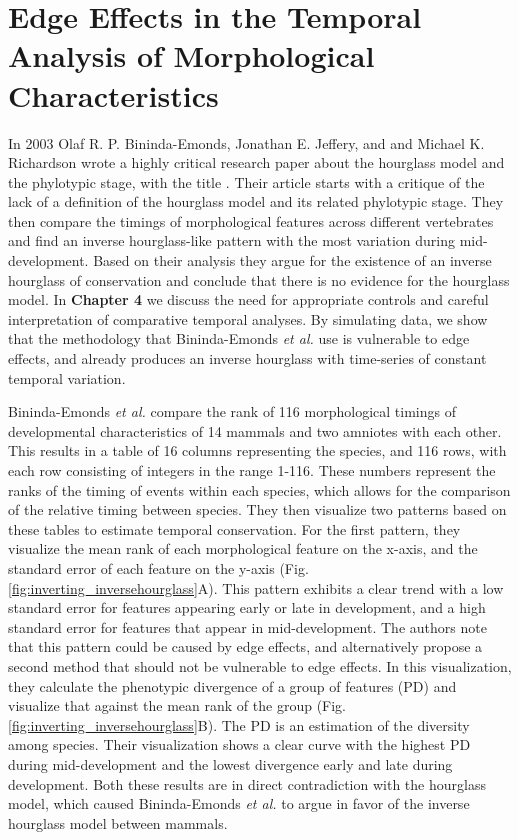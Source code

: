 \chapter{Edge Effects in the Temporal Analysis of Morphological Characteristics}\thumbforchapter
\newpage

In 2003 Olaf R. P. Bininda-Emonds, Jonathan E. Jeffery, and and Michael K. Richardson wrote a highly critical research paper about the hourglass model and the phylotypic stage, with the title \cite{OlafRP2003}. Their article starts with a critique of the lack of a definition of the hourglass model and its related phylotypic stage. They then compare the timings of morphological features across different vertebrates and find an inverse hourglass-like pattern with the most variation during mid-development. Based on their analysis they argue for the existence of an inverse hourglass of conservation and conclude that there is no evidence for the hourglass model. In \textbf{Chapter 4} we discuss the need for appropriate controls and careful interpretation of comparative temporal analyses. By simulating data, we show that the methodology that Bininda-Emonds \textit{et al.} use is vulnerable to edge effects, and already produces an inverse hourglass with time-series of constant temporal variation.

Bininda-Emonds \textit{et al.} compare the rank of 116 morphological timings of developmental characteristics of 14 mammals and two amniotes with each other. This results in a table of 16 columns representing the species, and 116 rows, with each row consisting of integers in the range 1-116. These numbers represent the ranks of the timing of events within each species, which allows for the comparison of the relative timing between species. They then visualize two patterns based on these tables to estimate temporal conservation. For the first pattern, they visualize the mean rank of each morphological feature on the x-axis, and the standard error of each feature on the y-axis (Fig. \ref{fig:inverting_inversehourglass}A). This pattern exhibits a clear trend with a low standard error for features appearing early or late in development, and a high standard error for features that appear in mid-development. The authors note that this pattern could be caused by edge effects, and alternatively propose a second method that should not be vulnerable to edge effects. In this visualization, they calculate the phenotypic divergence of a group of features (PD) and visualize that against the mean rank of the group (Fig. \ref{fig:inverting_inversehourglass}B). The PD is an estimation of the diversity among species. Their visualization shows a clear curve with the highest PD during mid-development and the lowest divergence early and late during development. Both these results are in direct contradiction with the hourglass model, which caused Bininda-Emonds \textit{et al.} to argue in favor of the inverse hourglass model between mammals.

